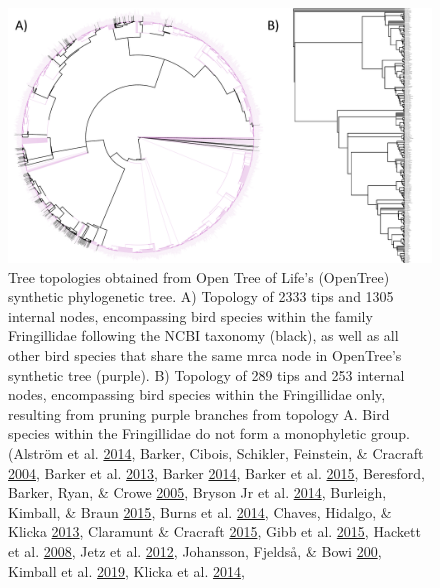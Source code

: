 \begin{figure}[!h]
\includegraphics{../figures/fringillidae-topologies/fringillidae-topology.pdf}
\caption{Tree topologies obtained from Open Tree of Life's (OpenTree) synthetic phylogenetic tree. A) Topology of 2333 tips and 1305 internal nodes, encompassing bird species within the family Fringillidae following the NCBI taxonomy (black), as well as all other bird species that share the same mrca node in OpenTree's synthetic tree (purple). B) Topology of 289 tips and 253 internal nodes, encompassing bird species within the Fringillidae only, resulting from pruning purple branches from topology A.
Bird species within the Fringillidae do not form a monophyletic group.
(Alström et al. \protect\hyperlink{ref-}{2014},
Barker, Cibois, Schikler, Feinstein, \& Cracraft \protect\hyperlink{ref-barker2004phylogeny}{2004},
Barker et al. \protect\hyperlink{ref-barker2013going}{2013},
Barker \protect\hyperlink{ref-barker2014mitogenomic}{2014},
Barker et al. \protect\hyperlink{ref-barker2015new}{2015},
Beresford, Barker, Ryan, \& Crowe \protect\hyperlink{ref-beresford2005african}{2005},
Bryson Jr et al. \protect\hyperlink{ref-bryson2014diversification}{2014},
Burleigh, Kimball, \& Braun \protect\hyperlink{ref-burleigh2015building}{2015},
Burns et al. \protect\hyperlink{ref-burns2014phylogenetics}{2014},
Chaves, Hidalgo, \& Klicka \protect\hyperlink{ref-chaves2013biogeography}{2013},
Claramunt \& Cracraft \protect\hyperlink{ref-claramunt2015new}{2015},
Gibb et al. \protect\hyperlink{ref-gibb2015new}{2015},
Hackett et al. \protect\hyperlink{ref-hackett2008phylogenomic}{2008},
Jetz et al. \protect\hyperlink{ref-Jetz2012}{2012},
Johansson, Fjeldså, \& Bowi \protect\hyperlink{ref-johansson2008phylogenetic}{200},
Kimball et al. \protect\hyperlink{ref-kimball2019phylogenomic}{2019},
Klicka et al. \protect\hyperlink{ref-klicka2014comprehensive}{2014},
}
\end{figure}

